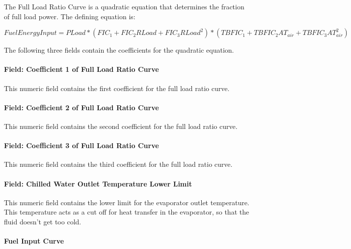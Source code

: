 The Full Load Ratio Curve is a quadratic equation that determines the fraction of full load power. The defining equation is:

\begin{equation}
    FuelEnergyInput = PLoad * (FI{C_1} + FI{C_2}RLoad + FI{C_3}RLoa{d^2}) * (TBFI{C_1} + TBFI{C_2}A{T_{air}} + TBFI{C_3}AT_{air}^2)
\end{equation}

The following three fields contain the coefficients for the quadratic equation.

\paragraph{Field: Coefficient 1 of Full Load Ratio Curve}\label{field-coefficient-1-of-full-load-ratio-curve-2}

This numeric field contains the first coefficient for the full load ratio curve.

\paragraph{Field: Coefficient 2 of Full Load Ratio Curve}\label{field-coefficient-2-of-full-load-ratio-curve-2}

This numeric field contains the second coefficient for the full load ratio curve.

\paragraph{Field: Coefficient 3 of Full Load Ratio Curve}\label{field-coefficient-3-of-full-load-ratio-curve-2}

This numeric field contains the third coefficient for the full load ratio curve.

\paragraph{Field: Chilled Water Outlet Temperature Lower Limit}\label{field-chilled-water-outlet-temperature-lower-limit-4}

This numeric field contains the lower limit for the evaporator outlet temperature. This temperature acts as a cut off for heat transfer in the evaporator, so that the fluid doesn't get too cold.

\paragraph{Fuel Input Curve}\label{fuel-input-curve}

